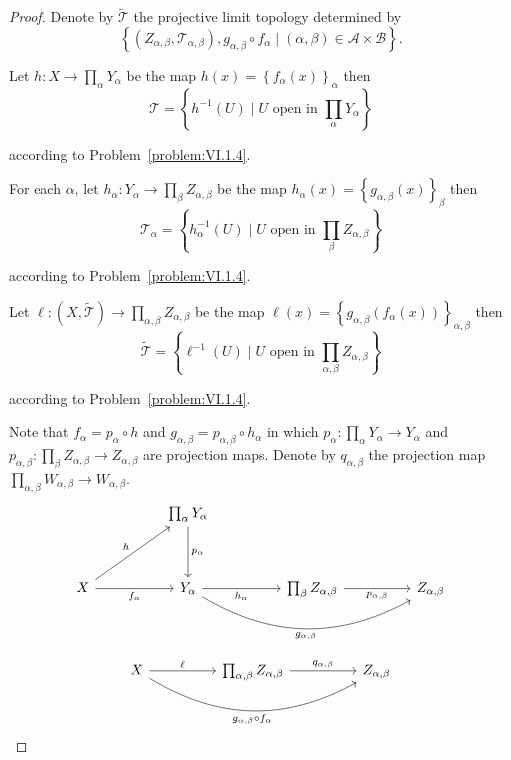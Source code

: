\begin{proof}
	Denote by \( \widetilde{\mathscr{T}} \) the projective limit topology determined by
	\[
		\left\{ (Z_{\alpha,\beta}, \mathscr{T}_{\alpha,\beta}), g_{\alpha,\beta} \circ f_{\alpha} \mid (\alpha, \beta) \in \mathscr{A} \times \mathscr{B} \right\}.
	\]

	Let \( h: X \to \prod_{\alpha} Y_{\alpha} \) be the map \( h(x) = {\left\{ f_{\alpha}(x) \right\}}_{\alpha} \) then
	\[
		\mathscr{T} = \left\{ h^{-1}(U) \mid U \text{ open in } \prod_{\alpha}Y_{\alpha} \right\}
	\]

	according to Problem~\ref{problem:VI.1.4}.

	For each \( \alpha \), let \( h_{\alpha}: Y_{\alpha} \to \prod_{\beta} Z_{\alpha,\beta} \) be the map \( h_{\alpha}(x) = {\left\{ g_{\alpha,\beta}(x) \right\}}_{\beta} \) then
	\[
		\mathscr{T}_{\alpha} = \left\{ h_{\alpha}^{-1}(U) \mid U \text{ open in } \prod_{\beta} Z_{\alpha,\beta} \right\}
	\]

	according to Problem~\ref{problem:VI.1.4}.

	Let \( \ell: (X, \widetilde{\mathscr{T}}) \to \prod_{\alpha,\beta} Z_{\alpha,\beta} \) be the map \( \ell(x) = {\left\{ g_{\alpha,\beta}(f_{\alpha}(x)) \right\}}_{\alpha,\beta} \) then
	\[
		\widetilde{\mathscr{T}} = \left\{ \ell^{-1}(U) \mid U \text{ open in } \prod_{\alpha,\beta} Z_{\alpha,\beta} \right\}
	\]

	according to Problem~\ref{problem:VI.1.4}.

	Note that \( f_{\alpha} = p_{\alpha} \circ h \) and \( g_{\alpha,\beta} = p_{\alpha,\beta} \circ h_{\alpha} \) in which \( p_{\alpha}: \prod_{\alpha} Y_{\alpha} \to Y_{\alpha} \) and \( p_{\alpha,\beta}: \prod_{\beta} Z_{\alpha,\beta} \to Z_{\alpha,\beta} \) are projection maps. Denote by \( q_{\alpha,\beta} \) the projection map \( \prod_{\alpha,\beta} W_{\alpha,\beta} \to W_{\alpha,\beta} \).
	\[
		\begin{tikzcd}
			&& {\prod_{\alpha} Y_{\alpha}} \\
			\\
			X && {Y_{\alpha}} && {\prod_{\beta}Z_{\alpha,\beta}} && {Z_{\alpha,\beta}}
			\arrow["{p_{\alpha}}", from=1-3, to=3-3]
			\arrow["h", from=3-1, to=1-3]
			\arrow["{f_{\alpha}}"', from=3-1, to=3-3]
			\arrow["{h_{\alpha}}"', from=3-3, to=3-5]
			\arrow["{g_{\alpha,\beta}}"', bend right, from=3-3, to=3-7]
			\arrow["{p_{\alpha,\beta}}"', from=3-5, to=3-7]
		\end{tikzcd}
	\]

	\[
		\begin{tikzcd}
			X && {\prod_{\alpha,\beta} Z_{\alpha,\beta}} && {Z_{\alpha,\beta}}
			\arrow["\ell", from=1-1, to=1-3]
			\arrow["{g_{\alpha,\beta} \circ f_{\alpha}}"', bend right, from=1-1, to=1-5]
			\arrow["{q_{\alpha,\beta}}", from=1-3, to=1-5]
		\end{tikzcd}
	\]


\end{proof}
